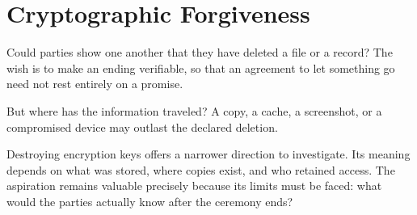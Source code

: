 \chapter{Cryptographic Forgiveness}
\label{short:cryptographic-forgiveness}

Could parties show one another that they have deleted a file or a record?
The wish is to make an ending verifiable, so that an agreement to let
something go need not rest entirely on a promise.

But where has the information traveled? A copy, a cache, a screenshot, or
a compromised device may outlast the declared deletion.

Destroying encryption keys offers a narrower direction to investigate. Its
meaning depends on what was stored, where copies exist, and who retained
access. The aspiration remains valuable precisely because its limits must
be faced: what would the parties actually know after the ceremony ends?


